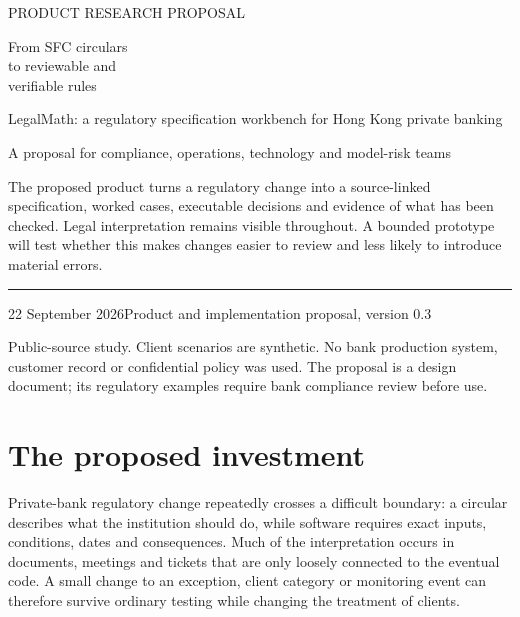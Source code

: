 \documentclass[11pt,a4paper]{article}
\begin{document}
\hypersetup{pageanchor=false}
\begin{titlepage}
\vspace*{20mm}
{\sffamily\color{teal}\large PRODUCT RESEARCH PROPOSAL\par}
\vspace{9mm}
{\sffamily\bfseries\color{navy}\fontsize{31}{36}\selectfont\raggedright From SFC circulars\\to reviewable and\\verifiable rules\par}
\vspace{9mm}
{\Large LegalMath: a regulatory specification workbench for Hong Kong private banking\par}
\vspace{14mm}
{\large A proposal for compliance, operations, technology and model-risk teams\par}
\vfill
\begin{minipage}{0.91\textwidth}
The proposed product turns a regulatory change into a source-linked specification,
worked cases, executable decisions and evidence of what has been checked. Legal
interpretation remains visible throughout. A bounded prototype will test whether
this makes changes easier to review and less likely to introduce material errors.
\end{minipage}
\vspace{18mm}
\hrule
\vspace{5mm}
22 September 2026\hfill Product and implementation proposal, version 0.3\par
\small Public-source study. Client scenarios are synthetic. No bank production
system, customer record or confidential policy was used. The proposal is a design
document; its regulatory examples require bank compliance review before use.
\end{titlepage}
\hypersetup{pageanchor=true}

\section*{The proposed investment}
Private-bank regulatory change repeatedly crosses a difficult boundary: a circular
describes what the institution should do, while software requires exact inputs,
conditions, dates and consequences. Much of the interpretation occurs in documents,
meetings and tickets that are only loosely connected to the eventual code. A small
change to an exception, client category or monitoring event can therefore survive
ordinary testing while changing the treatment of clients.
\end{document}
